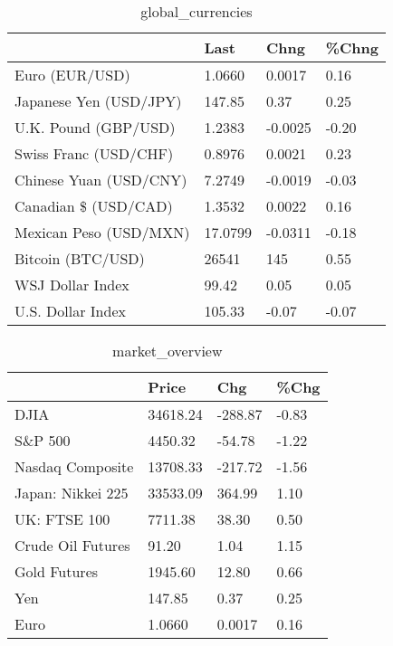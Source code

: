 \documentclass{article}%
\begin{document}
%


\begin{table}[htbp]%
\caption{global\_currencies}%
\centering%
\begin{adjustbox}{width=1\textwidth}%
\begin{tabular}{llll}
\toprule
                       &    Last &    Chng & \%Chng \\
\midrule
        Euro (EUR/USD) &  1.0660 &  0.0017 &  0.16 \\
Japanese Yen (USD/JPY) &  147.85 &    0.37 &  0.25 \\
  U.K. Pound (GBP/USD) &  1.2383 & -0.0025 & -0.20 \\
 Swiss Franc (USD/CHF) &  0.8976 &  0.0021 &  0.23 \\
Chinese Yuan (USD/CNY) &  7.2749 & -0.0019 & -0.03 \\
  Canadian \$ (USD/CAD) &  1.3532 &  0.0022 &  0.16 \\
Mexican Peso (USD/MXN) & 17.0799 & -0.0311 & -0.18 \\
     Bitcoin (BTC/USD) &   26541 &     145 &  0.55 \\
      WSJ Dollar Index &   99.42 &    0.05 &  0.05 \\
     U.S. Dollar Index &  105.33 &   -0.07 & -0.07 \\
\bottomrule
\end{tabular}
%
\end{adjustbox}%
\end{table}

%


\begin{table}[htbp]%
\caption{market\_overview}%
\centering%
\begin{adjustbox}{width=1\textwidth}%
\begin{tabular}{llll}
\toprule
                  &    Price &     Chg &  \%Chg \\
\midrule
             DJIA & 34618.24 & -288.87 & -0.83 \\
          S\&P 500 &  4450.32 &  -54.78 & -1.22 \\
 Nasdaq Composite & 13708.33 & -217.72 & -1.56 \\
Japan: Nikkei 225 & 33533.09 &  364.99 &  1.10 \\
     UK: FTSE 100 &  7711.38 &   38.30 &  0.50 \\
Crude Oil Futures &    91.20 &    1.04 &  1.15 \\
     Gold Futures &  1945.60 &   12.80 &  0.66 \\
              Yen &   147.85 &    0.37 &  0.25 \\
             Euro &   1.0660 &  0.0017 &  0.16 \\
\bottomrule
\end{tabular}
%
\end{adjustbox}%
\end{table}

%
\end{document}
